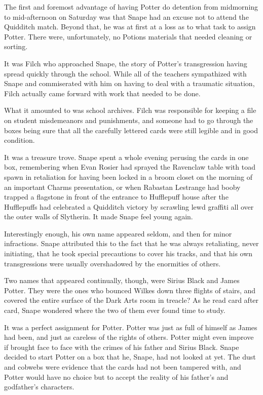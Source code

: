 \sbreak

The first and foremost advantage of having Potter do detention from midmorning to mid-afternoon on Saturday was that Snape had an excuse not to attend the Quidditch match. Beyond that, he was at first at a loss as to what task to assign Potter. There were, unfortunately, no Potions materials that needed cleaning or sorting.

It was Filch who approached Snape, the story of Potter's transgression having spread quickly through the school. While all of the teachers sympathized with Snape and commiserated with him on having to deal with a traumatic situation, Filch actually came forward with work that needed to be done.

What it amounted to was school archives. Filch was responsible for keeping a file on student misdemeanors and punishments, and someone had to go through the boxes being sure that all the carefully lettered cards were still legible and in good condition.

It was a treasure trove. Snape spent a whole evening perusing the cards in one box, remembering when Evan Rosier had sprayed the Ravenclaw table with toad spawn in retaliation for having been locked in a broom closet on the morning of an important Charms presentation, or when Rabastan Lestrange had booby trapped a flagstone in front of the entrance to Hufflepuff house after the Hufflepuffs had celebrated a Quidditch victory by scrawling lewd graffiti all over the outer walls of Slytherin. It made Snape feel young again.

Interestingly enough, his own name appeared seldom, and then for minor infractions. Snape attributed this to the fact that he was always retaliating, never initiating, that he took special precautions to cover his tracks, and that his own transgressions were usually overshadowed by the enormities of others.

Two names that appeared continually, though, were Sirius Black and James Potter. They were the ones who bounced Wilkes down three flights of stairs, and covered the entire surface of the Dark Arts room in treacle? As he read card after card, Snape wondered where the two of them ever found time to study.

It was a perfect assignment for Potter. Potter was just as full of himself as James had been, and just as careless of the rights of others. Potter might even improve if brought face to face with the crimes of his father and Sirius Black. Snape decided to start Potter on a box that he, Snape, had not looked at yet. The dust and cobwebs were evidence that the cards had not been tampered with, and Potter would have no choice but to accept the reality of his father's and godfather's characters.

